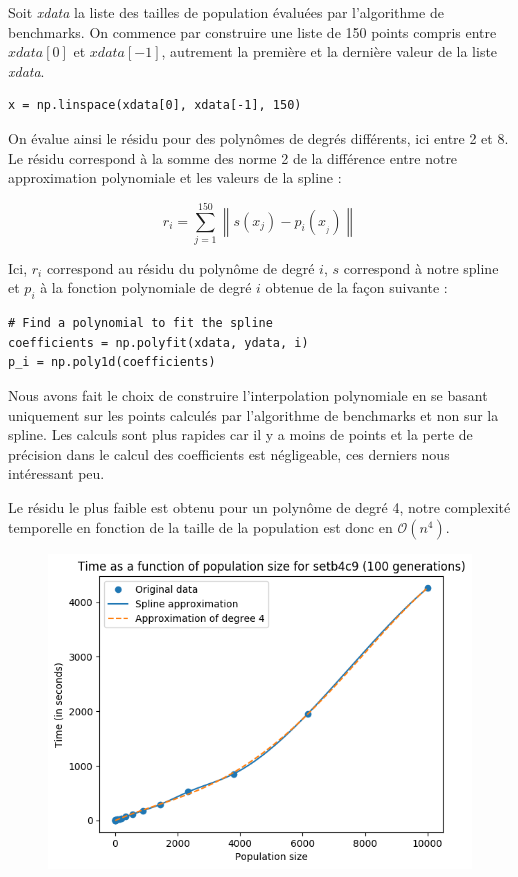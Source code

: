 Soit \textit{xdata} la liste des tailles de population évaluées par l'algorithme de benchmarks. On commence par construire une liste de 150 points compris entre $xdata[0]$ et $xdata[-1]$, autrement la première et la dernière valeur de la liste \textit{xdata}.

\begin{lstlisting}
x = np.linspace(xdata[0], xdata[-1], 150)
\end{lstlisting}

On évalue ainsi le résidu pour des polynômes de degrés différents, ici entre 2 et 8. Le résidu correspond à la somme des norme 2 de la différence entre notre approximation polynomiale et les valeurs de la spline :

$$ r_i = \sum_{j = 1}^{150} \left\| s(x_j) - p_i(x__j) \right\| $$

Ici, $r_i$ correspond au résidu du polynôme de degré $i$, $s$ correspond à notre spline et $p_i$ à la fonction polynomiale de degré $i$ obtenue de la façon suivante :

\begin{lstlisting}
# Find a polynomial to fit the spline
coefficients = np.polyfit(xdata, ydata, i)
p_i = np.poly1d(coefficients)
\end{lstlisting}

Nous avons fait le choix de construire l'interpolation polynomiale en se basant uniquement sur les points calculés par l'algorithme de benchmarks et non sur la spline. Les calculs sont plus rapides car il y a moins de points et la perte de précision dans le calcul des coefficients est négligeable, ces derniers nous intéressant peu.

Le résidu le plus faible est obtenu pour un polynôme de degré 4, notre complexité temporelle en fonction de la taille de la population est donc en $\mathcal{O}(n^4)$.

\begin{figure}[!h]
    \centering
    \includegraphics[]{report/Pictures/setb4c9_benchmarks_population_approximated.png}
\end{figure}

